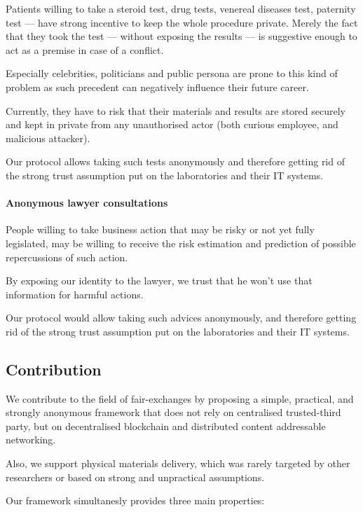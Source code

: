 \documentclass{ieeeaccess}
\begin{document}
Patients willing to take a steroid test, drug tests, venereal diseases
test, paternity test — have strong incentive to keep the whole
procedure private. Merely the fact that they took the test — without
exposing the results — is suggestive enough to act as a premise in
case of a conflict.

Especially celebrities, politicians and public persona are prone to this kind of problem as such precedent can negatively influence their future career.

Currently, they have to risk that their materials and results are stored
securely and kept in private from any unauthorised actor (both
curious employee, and malicious attacker).

Our protocol allows taking such tests anonymously and therefore getting
rid of the strong trust assumption put on the laboratories and their IT
systems.


\paragraph{Anonymous lawyer consultations} \label{anonymous-lawyer-consultations}

People willing to take business action that may be risky or not yet fully legislated, may be willing to receive the risk estimation and prediction of possible repercussions of such action.

By exposing our identity to the lawyer, we trust that he won't use that
information for harmful actions.

Our protocol would allow taking such advices anonymously, and therefore
getting rid of the strong trust assumption put on the laboratories and
their IT systems.


\subsection{Contribution}
We contribute to the field of fair-exchanges by proposing a simple,
practical, and strongly anonymous framework that does not rely on
centralised trusted-third party, but on decentralised blockchain and
distributed content addressable networking.

Also, we support physical materials delivery, which was rarely targeted
by other researchers or based on strong and unpractical assumptions.

Our framework simultanesly provides three main properties:
\end{document}
